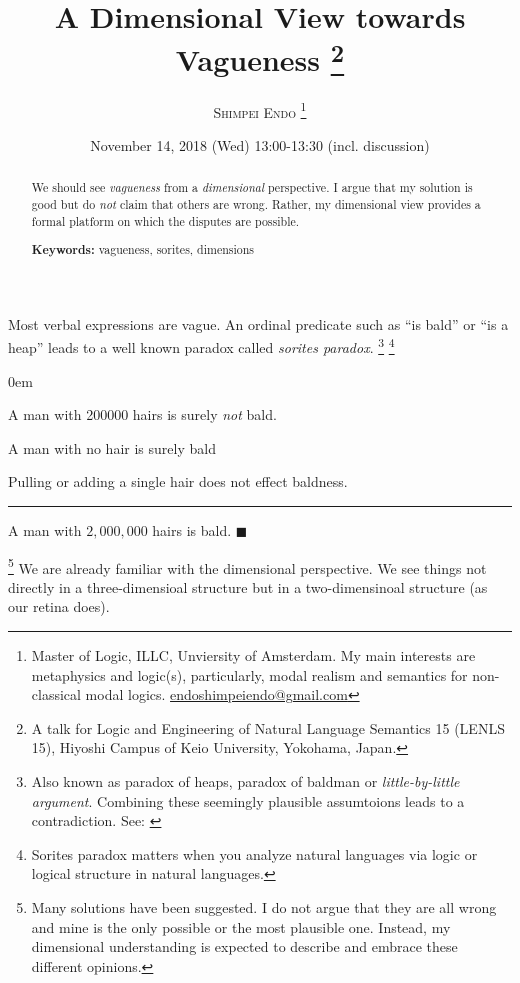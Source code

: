 \documentclass{tufte-handout}
\title{{\bf{A Dimensional View towards Vagueness} } %
\thanks{A talk for Logic and Engineering of Natural Language Semantics 15 (LENLS 15), Hiyoshi Campus of Keio University, Yokohama, Japan. }
}
\author{\textsc{Shimpei Endo
\thanks{Master of Logic, ILLC, Unviersity of Amsterdam.
My main interests are metaphysics and logic(s), particularly, modal realism and semantics for non-classical modal logics.
\Letter \url{endoshimpeiendo@gmail.com}
}
}
}
\date{November 14, 2018 (Wed) 13:00-13:30 (incl. discussion)} %
\begin{document}
\maketitle %

\begin{abstract}
We should see \emph{vagueness} from a \emph{dimensional} perspective.
I argue that my solution is good but do \emph{not} claim that others are wrong.
Rather, my dimensional view provides a formal platform on which the disputes are possible.

\noindent \textbf{Keywords:} vagueness, sorites, dimensions
\end{abstract}

Most verbal expressions are vague.
 An ordinal predicate such as ``is bald'' or ``is a heap'' leads to a well known paradox called \emph{sorites paradox}.
\footnote{Also known as paradox of heaps, paradox of baldman or \emph{little-by-little argument}. Combining these seemingly plausible assumtoions leads to a contradiction. See:
\cite{Hyde2011-HYDTSP}
}
\footnote{Sorites paradox matters when you analyze natural languages via logic or logical structure in natural languages. }


\begin{description}
\itemsep0em

\item	[Obviously non-bald case:] A man with 200000 hairs is surely \emph{not} bald.

\item	[Obviously bald case:] A man with no hair is surely bald

\item	[Tolerance Principle:]
Pulling or adding a single hair does not effect baldness.

\noindent\rule{10cm}{0.4pt}

\item [Unwelcome conclusion:]
A man with $2,000,000$ hairs is bald.
$\blacksquare$

\end{description}

\footnote{Many solutions have been suggested.
I do not argue that they are all wrong and mine is the only possible or the most plausible one. Instead, my dimensional understanding is expected to describe and embrace these different opinions.}
We are already familiar with the dimensional perspective.
We see things not directly in a three-dimensioal structure but in a two-dimensinoal structure (as our retina does).
\end{document}
